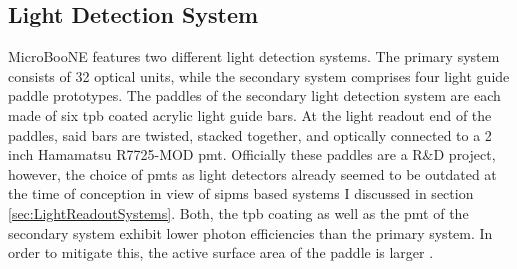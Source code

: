 \subsection{Light Detection System} \label{sec:MicroBooNELightDetection}
MicroBooNE features two different light detection systems. The primary system consists of \num{32} optical units, while the secondary system comprises four light guide paddle prototypes. The paddles of the secondary light detection system are each made of six \gls{tpb} coated acrylic light guide bars. At the light readout end of the paddles, said bars are twisted, stacked together, and optically connected to a \num{2} inch Hamamatsu R7725-MOD \gls{pmt}. Officially these paddles are a R\&D project, however, the choice of \glspl{pmt} as light detectors already seemed to be outdated at the time of conception in view of \glspl{sipm} based systems I discussed in section \ref{sec:LightReadoutSystems}. Both, the \gls{tpb} coating as well as the \gls{pmt} of the secondary system exhibit lower photon efficiencies than the primary system. In order to mitigate this, the active surface area of the paddle is larger \cite{MicroBooNEDetector}.

